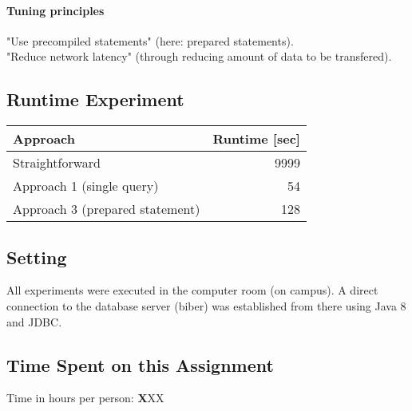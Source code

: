 \documentclass[11pt]{scrartcl}
\begin{document}
  \paragraph{Tuning principles}
  
	"Use precompiled statements" (here: prepared statements).
	\\
  	"Reduce network latency" (through reducing amount of data to be transfered).

  \subsection*{Runtime Experiment}
  \begin{table}[H]
  \begin{tabular}{l|r}
    Approach & Runtime [sec] \\
    \hline
    Straightforward & 9999 \\
    Approach 1 (single query) & 54 \\
    Approach 3 (prepared statement) & 128
  \end{tabular}
  \end{table}

  \bigskip
  
  \subsection*{Setting}
  All experiments were executed in the computer room (on campus). A direct connection to the database server (biber) was established from there using Java 8 and JDBC.
  
  
  \subsection*{Time Spent on this Assignment}

  Time in hours per person: {\textbf XXX}
\end{document}
